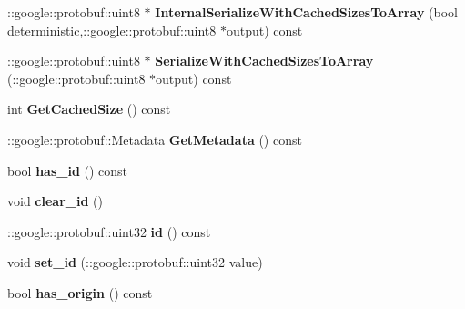 \begin{DoxyCompactItemize}
\item 
\+::google\+::protobuf\+::uint8 $\ast$ {\bfseries Internal\+Serialize\+With\+Cached\+Sizes\+To\+Array} (bool deterministic,\+::google\+::protobuf\+::uint8 $\ast$output) const \hypertarget{classvss__state_1_1Global__State_a8f00725e70bfba6a8ede5ed325a23a28}{}\label{classvss__state_1_1Global__State_a8f00725e70bfba6a8ede5ed325a23a28}

\item 
\+::google\+::protobuf\+::uint8 $\ast$ {\bfseries Serialize\+With\+Cached\+Sizes\+To\+Array} (\+::google\+::protobuf\+::uint8 $\ast$output) const \hypertarget{classvss__state_1_1Global__State_a4c06db3a1b1b366f5f1baa3008ff5bdb}{}\label{classvss__state_1_1Global__State_a4c06db3a1b1b366f5f1baa3008ff5bdb}

\item 
int {\bfseries Get\+Cached\+Size} () const \hypertarget{classvss__state_1_1Global__State_aa94066556db76353540b8b54d77eed2e}{}\label{classvss__state_1_1Global__State_aa94066556db76353540b8b54d77eed2e}

\item 
\+::google\+::protobuf\+::\+Metadata {\bfseries Get\+Metadata} () const \hypertarget{classvss__state_1_1Global__State_a3b2d5b30093df0eb8b20f991dc2d8d9e}{}\label{classvss__state_1_1Global__State_a3b2d5b30093df0eb8b20f991dc2d8d9e}

\item 
bool {\bfseries has\+\_\+id} () const \hypertarget{classvss__state_1_1Global__State_a7d7595f10e8923fada79b67c77ba7cd3}{}\label{classvss__state_1_1Global__State_a7d7595f10e8923fada79b67c77ba7cd3}

\item 
void {\bfseries clear\+\_\+id} ()\hypertarget{classvss__state_1_1Global__State_a0b001773d7aafdb5acef5b36c35f7075}{}\label{classvss__state_1_1Global__State_a0b001773d7aafdb5acef5b36c35f7075}

\item 
\+::google\+::protobuf\+::uint32 {\bfseries id} () const \hypertarget{classvss__state_1_1Global__State_ab0ff3c2867cdfda57429a649c9abde17}{}\label{classvss__state_1_1Global__State_ab0ff3c2867cdfda57429a649c9abde17}

\item 
void {\bfseries set\+\_\+id} (\+::google\+::protobuf\+::uint32 value)\hypertarget{classvss__state_1_1Global__State_a183935ca3daee149b526d4a50cce450e}{}\label{classvss__state_1_1Global__State_a183935ca3daee149b526d4a50cce450e}

\item 
bool {\bfseries has\+\_\+origin} () const \hypertarget{classvss__state_1_1Global__State_ab80313b62ce603f182c3e2e1fbea8da5}{}\label{classvss__state_1_1Global__State_ab80313b62ce603f182c3e2e1fbea8da5}


\end{DoxyCompactItemize}

